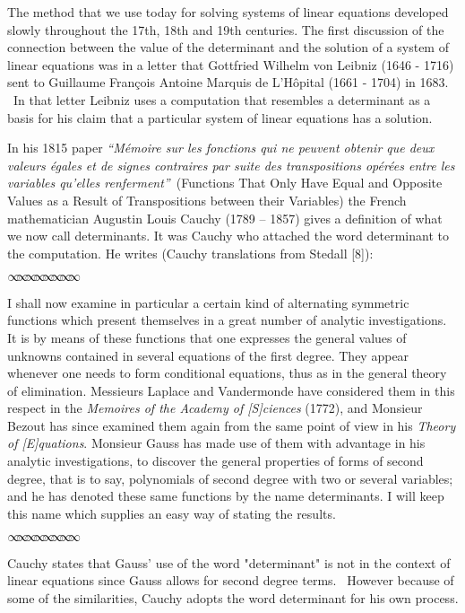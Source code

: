 \documentclass[11pt]{article}%
\theoremstyle{definition}
\newcommand{\sep}{\vspace{-3pt} \begin{center}
{\mathversion{normal}
$\infty \mspace{-5.5mu} \infty \mspace{-5.5mu}
\infty \mspace{-5.5mu} \infty \mspace{-5.5mu}
\infty \mspace{-5.5mu} \infty \mspace{-5.5mu}
\infty \mspace{-5.5mu} \infty$}
\end{center} \vspace{-3pt}}
\begin{document}
The method that we use today for solving systems of linear equations developed
slowly throughout the 17th, 18th and 19th centuries. The first discussion of
the connection between the value of the determinant and the solution of a
system of linear equations was in a letter that Gottfried Wilhelm von Leibniz
(1646 - 1716) sent to Guillaume Fran\c{c}ois Antoine Marquis de L'H\^{o}pital
(1661 - 1704) in 1683. \ In that letter Leibniz uses a computation that
resembles a determinant as a basis for his claim that a particular system of
linear equations has a solution.\textit{ }

In his 1815 paper \textit{\textquotedblleft M\'{e}moire sur les fonctions qui
ne peuvent obtenir que deux valeurs \'{e}gales et de signes contraires par
suite des transpositions op\'{e}r\'{e}es entre les variables qu'elles
renferment\textquotedblright}\ (Functions That Only Have Equal and Opposite
Values as a Result of Transpositions between their Variables) the French
mathematician Augustin Louis Cauchy (1789 -- 1857) gives a definition of what
we now call determinants. It was Cauchy who attached the word determinant to
the computation. He writes (Cauchy translations from Stedall [8]):%

\sep


\textsf{I shall now examine in particular a certain kind of alternating
symmetric functions which present themselves in a great number of analytic
investigations. It is by means of these functions that one expresses the
general values of unknowns contained in several equations of the first degree.
They appear whenever one needs to form conditional equations, thus as in the
general theory of elimination. Messieurs Laplace and Vandermonde have
considered them in this respect in the \textit{Memoires of the Academy of
[S]ciences} (1772), and Monsieur Bezout has since examined them again from the
same point of view in his \textit{Theory of [E]quations}. Monsieur Gauss has
made use of them with advantage in his analytic investigations, to discover
the general properties of forms of second degree, that is to say, polynomials
of second degree with two or several variables; and he has denoted these same
functions by the name determinants. I will keep this name which supplies an
easy way of stating the results.}%

\sep


Cauchy states that Gauss' use of the word "determinant" is not in the context
of linear equations since Gauss allows for second degree terms. \ However
because of some of the similarities, Cauchy adopts the word determinant for
his own process. \
\end{document}
